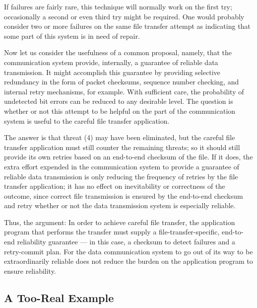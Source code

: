 \documentclass[a4paper,11pt,notitlepage,twoside,openright]{article}
\begin{document}
If failures are fairly rare, this technique will normally work on the
first try; occasionally a second or even third try might be required.
One would probably consider two or more failures on the same file
transfer attempt as indicating that some part of this system is in need
of repair.


Now let us consider the usefulness of a common proposal, namely, that
the communication system provide, internally, a guarantee of reliable
data transmission. It might accomplish this guarantee by providing
selective redundancy in the form of packet checksums, sequence number
checking, and internal retry mechanisms, for example. With sufficient
care, the probability of undetected bit errors can be reduced to any
desirable level. The question is whether or not this attempt to be
helpful on the part of the communication system is useful to the careful
file transfer application.

The answer is that threat (4) may have been eliminated, but the careful
file transfer application must still counter the remaining threats; so
it should still provide its own retries based on an end-to-end checksum
of the file. If it does, the extra effort expended in the communication
system to provide a guarantee of reliable data transmission is only
reducing the frequency of retries by the file transfer application; it
has no effect on inevitability or correctness of the outcome, since
correct file transmission is ensured by the end-to-end checksum and
retry whether or not the data transmission system is especially
reliable.

Thus, the argument: In order to achieve careful file transfer, the
application program that performs the transfer must supply a
file-transfer-specific, end-to-end reliability guarantee --- in this
case, a checksum to detect failures and a retry-commit plan. For the
data communication system to go out of its way to be extraordinarily
reliable does not reduce the burden on the application program to ensure
reliability.


\hypertarget{a-too-real-example}{%
\subsection{A Too-Real Example}\label{a-too-real-example}}
\end{document}

